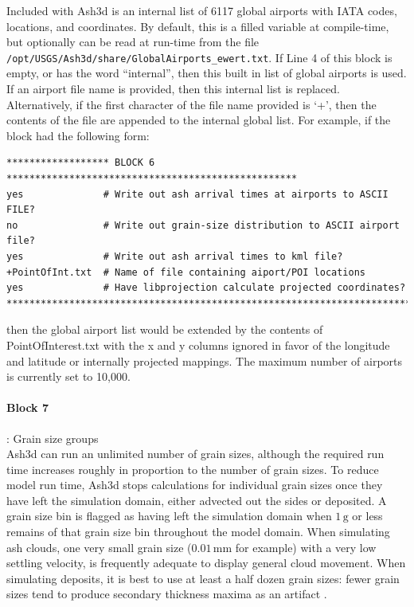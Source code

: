 Included with Ash3d is an internal list of 6117 global airports with IATA codes,
locations, and coordinates. By default, this is a filled variable at compile-time,
but optionally can be read at run-time from the
file \texttt{/opt/USGS/Ash3d/share/GlobalAirports\_ewert.txt}. If Line 4 of this
block is empty, or has the word ``internal'', then this built in list of global
airports is used. If an airport file name is provided, then this internal list
is replaced. Alternatively, if the first character of the file name provided is
`+', then the contents of the file are appended to the internal global list. For
example, if the block had the following form:
\small
\begin{verbatim}
****************** BLOCK 6 ***************************************************
yes              # Write out ash arrival times at airports to ASCII FILE?
no               # Write out grain-size distribution to ASCII airport file?
yes              # Write out ash arrival times to kml file?
+PointOfInt.txt  # Name of file containing aiport/POI locations
yes              # Have libprojection calculate projected coordinates?
*******************************************************************************
\end{verbatim}
\normalsize
then the global airport list would be extended by the contents of PointOfInterest.txt
with the x and y columns ignored in favor of the longitude and latitude or
internally projected mappings. The maximum number of airports is currently set
to 10,000.

\paragraph{Block 7}: Grain size groups\\
Ash3d can run an unlimited number of grain sizes, although the required run time
increases roughly in proportion to the number of grain sizes. To reduce model run
time, Ash3d stops calculations for individual grain sizes once they have left the
simulation domain, either advected out the sides or deposited. A grain size bin is
flagged as having left the simulation domain when $1 \, \mathrm{g}$ or less remains of
that grain size bin throughout the model domain.
When simulating ash clouds, one very small grain size ($0.01 \, \mathrm{mm}$ for
example) with a
very low settling velocity, is frequently adequate to display general cloud movement.
When simulating deposits, it is best to use at least a half dozen grain sizes: fewer
grain sizes tend to produce secondary thickness maxima as an artifact
\cite{Mastin12}.


